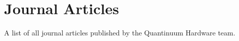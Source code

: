 \documentclass[aps, prl, preprintnumbers, twocolumn, superscriptaddress, nofootinbib, floatfix, 10pt]{revtex4-1}
\begin{document}
\section{Journal Articles}

A list of all journal articles published by the Quantinuum Hardware team.



\nocite{*}
\end{document}
